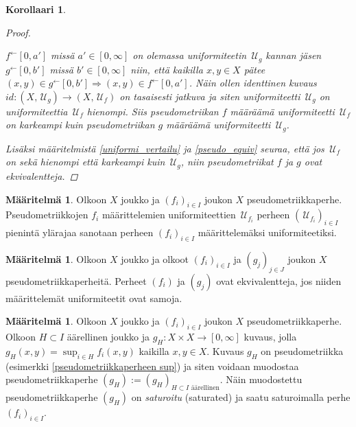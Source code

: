 \documentclass[12pt,a4paper,leqno]{report}
\newcommand{\R}{\mathbb{R}}
\newcommand{\U}{\,\mathcal{U}}
\theoremstyle{plain}
\newtheorem{kor}[equation]{Korollaari}
\theoremstyle{definition}
\newtheorem{maar}[equation]{Määritelmä}
\newtheorem{esim}[equation]{Esimerkki}
\theoremstyle{remark}
\begin{document}
\begin{kor}
\begin{proof}
\begin{enumerate}
$f^{\leftarrow}[0,a']$ missä $a'\in[0,\infty] $ on olemassa uniformiteetin $\U_g$ 
kannan jäsen $g^{\leftarrow}[0,b']$ missä $b'\in[0,\infty]$ niin, 
että kaikilla $x,y\in X$ pätee $(x,y)\in g^{\leftarrow}[0,b']\Rightarrow (x,y)\in f^{\leftarrow}[0,a']$. 
Näin ollen identtinen kuvaus $id\colon (X,\U_g)\rightarrow (X,\U_f)$ on 
tasaisesti jatkuva ja siten uniformiteetti $\U_g$ on uniformiteettia $\U_f$ hienompi. 
Siis pseudometriikan $f$ määräämä uniformiteetti 
$\U_f$ 
on karkeampi kuin pseudometriikan $g$ määräämä uniformiteetti $\U_g$.
\end{enumerate}
Lisäksi 
määritelmistä \ref{uniformi_vertailu} ja \ref{pseudo_equiv} seuraa, että jos $\U_f$ on sekä hienompi että karkeampi kuin $\U_g$, niin pseudometriikat $f$ ja $g$ ovat ekvivalentteja.
\end{proof}
\end{kor}
\begin{maar}
Olkoon $X$ joukko ja $(f_i)_{i\in I} $ joukon $X$ pseudometriikkaperhe. 
Pseudometriikkojen $f_i$ määrittelemien uniformiteettien $\U_{f_i}$ perheen $(\U_{f_i})_{i\in I}$ pienintä ylärajaa 
sanotaan perheen $(f_i)_{i\in I}$ määrittelemäksi uniformiteetiksi. 
\end{maar}
\begin{maar}
Olkoon $X$ joukko ja olkoot $(f_i)_{i\in I} $ ja $(g_j)_{j\in J} $ joukon $X$ pseudometriikkaperheitä. 
Perheet $(f_i)$ ja $(g_j) $ ovat ekvivalentteja, jos niiden määrittelemät uniformiteetit ovat samoja.
\end{maar}
\begin{maar}\label{saturoitu maar}
Olkoon $X$ joukko
ja $(f_i)_{i\in I} $ joukon $X$ pseudometriikkaperhe. 
Olkoon $H\subset I$ äärellinen joukko ja $g_{H}\colon X\times X\rightarrow [0,\infty]$ kuvaus, 
jolla $g_{H}(x,y)=\sup_{i\in H}f_i(x,y)$ kaikilla $x,y\in X$. 
Kuvaus $g_{H}$ on pseudometriikka 
(esimerkki \ref{pseudometriikkaperheen sup}) 
ja siten voidaan muodostaa pseudometriikkaperhe 
$(g_{H}):=(g_{H})_{H\subset I \text{ äärellinen}}$. 
Näin 
muodostettu pseudometriikkaperhe $(g_H)$ on
 \emph{saturoitu} (saturated) ja 
saatu saturoimalla perhe $(f_i)_{i\in I}$. 
\end{maar}
\end{document}
